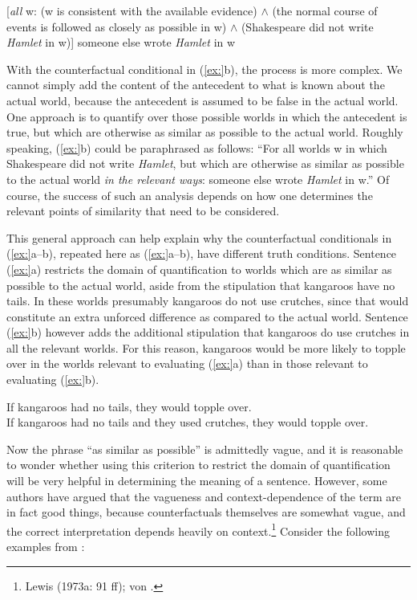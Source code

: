 \ea
{}[\textit{all} w: (w is consistent with the available evidence) $\wedge$ (the normal course of events is followed as closely as possible in w) $\wedge$ (Shakespeare did not write \textit{Hamlet} in w)] someone else wrote \textit{Hamlet} in w
\z


With the counterfactual conditional in (\ref{ex:}b), the process is more complex. We cannot simply add the content of the antecedent to what is known about the actual world, because the antecedent is assumed to be false in the actual world. One approach is to quantify over those possible worlds in which the antecedent is true, but which are otherwise as similar as possible to the actual world. Roughly speaking, (\ref{ex:}b) could be paraphrased as follows: “For all worlds w in which Shakespeare did not write \textit{Hamlet}, but which are otherwise as similar as possible to the actual world \textit{in the relevant ways}: someone else wrote \textit{Hamlet} in w.” Of course, the success of such an analysis depends on how one determines the relevant points of similarity that need to be considered.



This general approach can help explain why the counterfactual conditionals in (\ref{ex:}a--b), repeated here as (\ref{ex:}a--b), have different truth conditions. Sentence (\ref{ex:}a) restricts the domain of quantification to worlds which are as similar as possible to the actual world, aside from the stipulation that kangaroos have no tails. In these worlds presumably kangaroos do not use crutches, since that would constitute an extra unforced difference as compared to the actual world. Sentence (\ref{ex:}b) however adds the additional stipulation that kangaroos do use crutches in all the relevant worlds. For this reason, kangaroos would be more likely to topple over in the worlds relevant to evaluating (\ref{ex:}a) than in those relevant to evaluating (\ref{ex:}b).


\ea
\ea If kangaroos had no tails, they would topple over.\\
\ex If kangaroos had no tails and they used crutches, they would topple over.
                       \z
\z


Now the phrase “as similar as possible” is admittedly vague, and it is reasonable to wonder whether using this criterion to restrict the domain of quantification will be very helpful in determining the meaning of a sentence. However, some authors have argued that the vagueness and context-dependence of the term are in fact good things, because counterfactuals themselves are somewhat vague, and the correct interpretation depends heavily on context.\footnote{Lewis (1973a: 91 ff); von \citet{Fintel2012}.} Consider the following examples from \citet[221]{Quine1960}:


